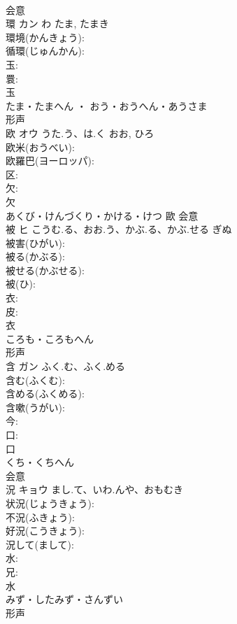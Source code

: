 \documentclass[8pt]{extreport}
\begin{document}
\begin{CJK}{UTF8}{min}
\\	会意 
\\	環	カン	わ	たま, たまき	
\\	環境(かんきょう): 
\\	循環(じゅんかん): 
\\	玉: 
\\	睘: 
\\	玉	
\\	たま・たまへん ・ おう・おうへん・あうさま	
\\	形声 
\\	欧	オウ	うた.う、は.く	おお, ひろ	
\\	欧米(おうべい): 
\\	欧羅巴(ヨーロッパ): 
\\	区: 
\\	欠: 
\\	欠	
\\	あくび・けんづくり・かける・けつ	歐	会意 
\\	被	ヒ	こうむ.る、おお.う、かぶ.る、かぶ.せる	ぎぬ	
\\	被害(ひがい): 
\\	被る(かぶる): 
\\	被せる(かぶせる): 
\\	被(ひ): 
\\	衣: 
\\	皮: 
\\	衣	
\\	ころも・ころもへん	
\\	形声 
\\	含	ガン	ふく.む、ふく.める		
\\	含む(ふくむ): 
\\	含める(ふくめる): 
\\	含嗽(うがい): 
\\	今: 
\\	口: 
\\	口	
\\	くち・くちへん	
\\	会意 
\\	況	キョウ	まし.て、いわ.んや、おもむき		
\\	状況(じょうきょう): 
\\	不況(ふきょう): 
\\	好況(こうきょう): 
\\	況して(まして): 
\\	水: 
\\	兄: 
\\	水	
\\	みず・したみず・さんずい	
\\	形声 

\end{CJK}
\end{document}
